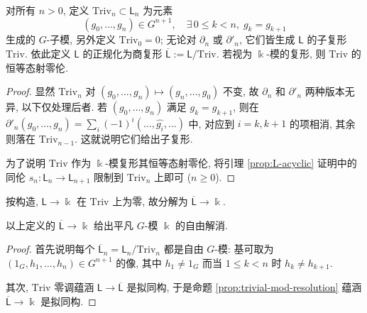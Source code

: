 \begin{definition-proposition}[正规化复形]
	对所有 $n > 0$, 定义 $\mathrm{Triv}_n \subset \mathsf{L}_n$ 为元素
	\[ (g_0, \ldots, g_n) \in G^{n+1}, \quad \exists\, 0 \leq k < n, \; g_k = g_{k+1} \]
	生成的 $G$-子模, 另外定义 $\mathrm{Triv}_0 = 0$; 无论对 $\partial_n$ 或 $\partial'_n$, 它们皆生成 $\mathsf{L}$ 的子复形 $\mathrm{Triv}$. 依此定义 $\mathsf{L}$ 的正规化为商复形 $\overline{\mathsf{L}} := \mathsf{L}/\mathrm{Triv}$. 若视为 $\Bbbk$-模的复形, 则 $\mathrm{Triv}$ 的恒等态射零伦.
\end{definition-proposition}
\begin{proof}
	显然 $\mathrm{Triv}_n$ 对 $(g_0, \ldots, g_n) \mapsto (g_n, \ldots, g_0)$ 不变, 故 $\partial_n$ 和 $\partial'_n$ 两种版本无异, 以下仅处理后者. 若 $(g_0, \ldots, g_n)$ 满足 $g_k = g_{k+1}$, 则在 $\partial'_n (g_0, \ldots, g_n) = \sum_i (-1)^i (\ldots, \widehat{g_i}, \ldots)$ 中, 对应到 $i = k, k+1$ 的项相消, 其余则落在 $\mathrm{Triv}_{n-1}$. 这就说明它们给出子复形.
	
	为了说明 $\mathrm{Triv}$ 作为 $\Bbbk$-模复形其恒等态射零伦, 将引理 \ref{prop:L-acyclic} 证明中的同伦 $s_n: \mathsf{L}_n \to \mathsf{L}_{n+1}$ 限制到 $\mathrm{Triv}_n$ 上即可 ($n \geq 0$).
\end{proof}

按构造, $\mathsf{L} \to \Bbbk$ 在 $\mathrm{Triv}$ 上为零, 故分解为 $\overline{\mathsf{L}} \to \Bbbk$.

\begin{proposition}\label{prop:trivial-mod-nor-resolution}
	以上定义的 $\overline{\mathsf{L}} \to \Bbbk$ 给出平凡 $G$-模 $\Bbbk$ 的自由解消.
\end{proposition}
\begin{proof}
	首先说明每个 $\overline{\mathsf{L}}_n = \mathsf{L}_n / \mathrm{Triv}_n$ 都是自由 $G$-模: 基可取为 $(1_G, h_1, \ldots, h_n) \in G^{n+1}$ 的像, 其中 $h_1 \neq 1_G$ 而当 $1 \leq k < n$ 时 $h_k \neq h_{k+1}$.
	
	其次, $\mathrm{Triv}$ 零调蕴涵 $\mathsf{L} \to \overline{\mathsf{L}}$ 是拟同构, 于是命题 \ref{prop:trivial-mod-resolution} 蕴涵 $\overline{\mathsf{L}} \to \Bbbk$ 是拟同构.
\end{proof}


